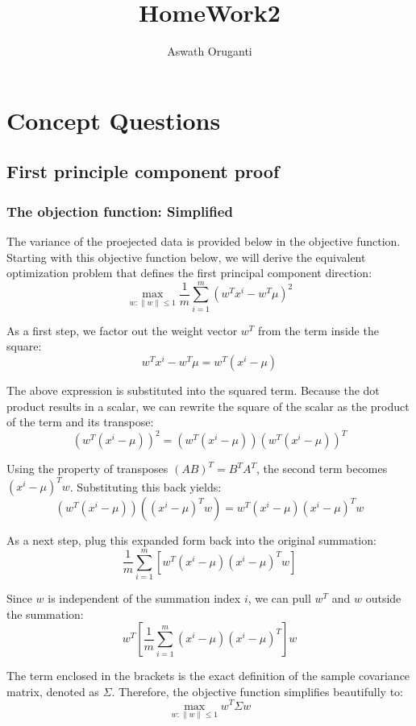\documentclass[twoside, 10pt]{article}
\begin{document}
\title{\textbf{\Large HomeWork2}}
\author{Aswath Oruganti}
\maketitle

\section{Concept Questions}


\subsection{First principle component proof}
\subsubsection{The objection function: Simplified} %
The variance of the proejected data is provided below in the objective function. Starting with this objective function below, we will derive the equivalent optimization problem that defines the first principal component direction:
\[ \max_{w : \|w\| \le 1} \frac{1}{m} \sum_{i=1}^{m} (w^T x^i - w^T \mu)^2 \]

As a first step, we factor out the weight vector $w^T$ from the term inside the square:
\[ w^T x^i - w^T \mu = w^T (x^i - \mu) \]

The above expression is substituted into the squared term. Because the dot product results in a scalar, we can rewrite the square of the scalar as the product of the term and its transpose:
\[ \left(w^T (x^i - \mu)\right)^2 = \left(w^T (x^i - \mu)\right) \left(w^T (x^i - \mu)\right)^T \]

Using the property of transposes $(AB)^T = B^T A^T$, the second term becomes $(x^i - \mu)^T w$. Substituting this back yields:
\[ \left(w^T (x^i - \mu)\right) \left((x^i - \mu)^T w\right) = w^T (x^i - \mu)(x^i - \mu)^T w \]

As a next step, plug this expanded form back into the original summation:
\[ \frac{1}{m} \sum_{i=1}^{m} \left[ w^T (x^i - \mu)(x^i - \mu)^T w \right] \]

Since $w$ is independent of the summation index $i$, we can pull $w^T$ and $w$ outside the summation:
\[ w^T \left[ \frac{1}{m} \sum_{i=1}^{m} (x^i - \mu)(x^i - \mu)^T \right] w \]

The term enclosed in the brackets is the exact definition of the sample covariance matrix, denoted as $\Sigma$. Therefore, the objective function simplifies beautifully to:
\[ \max_{w : \|w\| \le 1} w^T \Sigma w \]
\end{document}
